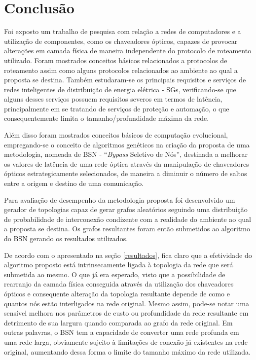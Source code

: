\chapter{Conclusão}

Foi exposto um trabalho de pesquisa com relação a redes de computadores e a utilização de componentes, como os chaveadores ópticos, capazes de provocar alterações em camada física de maneira independente do protocolo de roteamento utilizado. Foram mostrados conceitos básicos relacionados a protocolos de roteamento assim como alguns protocolos relacionados ao ambiente ao qual a proposta se destina. Também estudaram-se os principais requisitos e serviços de redes inteligentes de distribuição de energia elétrica - SGs, verificando-se que alguns desses serviços possuem requisitos severos em termos de latência, principalmente em se tratando de serviços de proteção e automação, o que consequentemente limita o tamanho/profundidade máxima da rede.

Além disso foram mostrados conceitos básicos de computação evolucional, empregando-se o conceito de algoritmos genéticos na criação da proposta de uma metodologia, nomeada de BSN - ``\emph{Bypass} Seletivo de Nós'', destinada a melhorar os valores de latência de uma rede óptica através da manipulação de chaveadores ópticos estrategicamente selecionados, de maneira a diminuir o número de saltos entre a origem e destino de uma comunicação.

Para avaliação de desempenho da metodologia proposta foi desenvolvido um gerador de topologias capaz de gerar grafos aleatórios seguindo uma distribuição de probabilidade de interconexão condizente com a realidade do ambiente ao qual a proposta se destina. Os grafos resultantes foram então submetidos ao algoritmo do BSN gerando os resultados utilizados.

De acordo com o apresentado na seção \ref{resultados}, fica claro que a efetividade do algoritmo proposto está intrinsecamente ligada à topologia da rede que será submetida ao mesmo. O que já era esperado, visto que a possibilidade de rearranjo da camada física conseguida através da utilização dos chaveadores ópticos e consequente alteração da topologia resultante depende de como e quantos nós estão interligados na rede original. Mesmo assim, pode-se notar uma sensível melhora nos parâmetros de custo ou profundidade da rede resultante em detrimento de sua largura quando comparada ao grafo da rede original. Em outras palavras, o BSN tem a capacidade de converter uma rede profunda em uma rede larga, obviamente sujeito à limitações de conexão já existentes na rede original, aumentando dessa forma o limite do tamanho máximo da rede utilizada.

